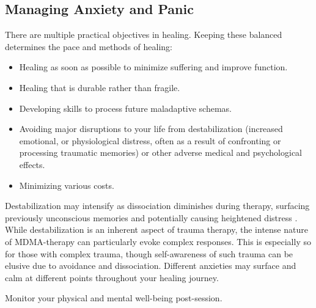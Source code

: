 \documentclass[12pt,letterpaper]{article}
\begin{document}
\subsection{Managing Anxiety and Panic}
\label{sectionManagement}
There are multiple practical objectives in healing. Keeping these balanced determines the pace and methods of healing:
\begin{itemize}
    \item Healing as soon as possible to minimize suffering and improve function.
    \item Healing that is durable rather than fragile.
    \item Developing skills to process future maladaptive schemas.
    \item Avoiding major disruptions to your life from destabilization (increased emotional, or physiological distress, often as a result of confronting or processing traumatic memories) or other adverse medical and psychological effects.
    \item Minimizing various costs.
\end{itemize}
Destabilization may intensify as dissociation diminishes during therapy, surfacing previously unconscious memories and potentially causing heightened distress \cite{vanderKolkBody}. While destabilization is an inherent aspect of trauma therapy, the intense nature of MDMA-therapy can particularly evoke complex responses. This is especially so for those with complex trauma, though self-awareness of such trauma can be elusive due to avoidance and dissociation. Different anxieties may surface and calm at different points throughout your healing journey.

Monitor your physical and mental well-being post-session. 

\vspace{\baselineskip}
\end{document}
